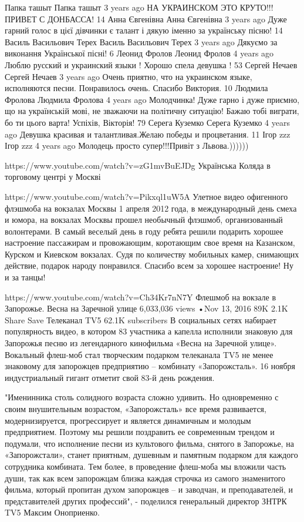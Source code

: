  Папка ташыт
Папка ташыт
3 years ago
НА УКРАИНСКОМ ЭТО КРУТО!!!ПРИВЕТ С ДОНБАССА!
14
Анна Євгенівна
Анна Євгенівна
3 years ago
Дуже гарний голос в цієї дівчинки є талант і дякую іменно за українську пісню!
14
Василь Васильович Терех
Василь Васильович Терех
3 years ago
Дякуємо за виконання Української пісні!
6
Леонид Фролов
Леонид Фролов
4 years ago
Люблю русский и украинский языки !  Хорошо спела девушка !
53
Сергей Нечаев
Сергей Нечаев
3 years ago
Очень приятно, что на украинском языке, исполняются песни. Понравилось очень. Спасибо Виктория.
10
Людмила Фролова
Людмила Фролова
4 years ago
Молодчинка! Дуже гарно і дуже приємно, що на українській мові, не зважаючи на політичну ситуацію! Бажаю тобі виграти, бо ти цього варта! Успіхів, Вікторія!
79
Серега Куземко
Серега Куземко
4 years ago
Девушка красивая и талантливая.Желаю победы и процветания.
11
Ігор zzz
Ігор zzz
4 years ago
Молодець просто супер!!!Привіт з Львова.)))))) 


https://www.youtube.com/watch?v=zG1mvBuEJDg
Українська Коляда в торговому центрі у Москві

https://www.youtube.com/watch?v=Pikxql1uW5A
Улетное видео офигенного флэшмоба на вокзалах Москвы
1 апреля 2012 года, в международный день смеха и юмора, на вокзалах Москвы прошел необычный флэшмоб, организованный волонтерами. В самый веселый день в году ребята решили подарить хорошее настроение пассажирам и провожающим, коротающим свое время на Казанском, Курском и Киевском вокзалах. Судя по количеству мобильных камер, снимающих действие, подарок народу понравился. Спасибо всем за хорошее настроение! Ну и за танцы!

https://www.youtube.com/watch?v=Ch34Kr7nN7Y
Флешмоб на вокзале в Запорожье. Весна на Заречной улице
6,033,036 views
•Nov 13, 2016
89K
2.1K
Share
Save
Телеканал TV5
62.1K subscribers
В социальных сетях набирает популярность видео, в котором 83 участника а капелла исполнили знаковую для Запорожья песню из легендарного кинофильма «Весна на Заречной улице».
Вокальный флеш-моб стал творческим подарком телеканала TV5 не менее знаковому для запорожцев предприятию – комбинату «Запорожсталь». 16 ноября индустриальный гигант отметит свой 83-й день рождения.

"Именинника столь солидного возраста сложно удивить. Но одновременно с своим внушительным возрастом, «Запорожсталь» все время развивается, модернизируется, прогрессирует и является динамичным и молодым предприятием. Поэтому мы решили поздравить ее современным трендом и подумали, что исполнение песни из культового фильма, снятого в Запорожье, на «Запорожстали», станет приятным, душевным и памятным подарком для каждого сотрудника комбината. Тем более, в проведение флеш-моба мы вложили часть души, так как всем запорожцам близка каждая строчка из самого знаменитого фильма, который пропитан духом запорожцев – и заводчан, и преподавателей, и представителей других профессий", - поделился генеральный директор ЗНТРК TV5 Максим Оноприенко.

